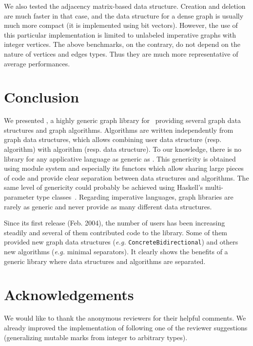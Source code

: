We also tested the adjacency matrix-based data structure. Creation and
deletion are much faster in that case, and the data structure for
a dense graph is usually much more compact (it is implemented using bit
vectors). However, the use of this particular implementation is
limited to unlabeled imperative graphs with integer vertices. 
The above benchmarks, on the contrary, do not depend on the nature of
vertices and edges types. Thus they are much more representative of
\ocamlgraph average performances.


\section{Conclusion}

We presented \ocamlgraph, a highly generic graph library for \ocaml\
providing several graph data structures and graph algorithms.
Algorithms are written independently from graph data structures, which
allows combining user data structure (resp. algorithm) with
\ocamlgraph algorithm (resp. data structure).  To our knowledge, there
is no library for any applicative language as generic as \ocamlgraph.
This genericity is obtained using \ocaml module system and especially
its functors which allow sharing large pieces of code and provide
clear separation between data structures and algorithms.  The same
level of genericity could probably be achieved using Haskell's
multi-parameter type
classes~\cite{XII:Dreyer2007,XII:Wehr2005,XII:Oleg}.  Regarding
imperative languages, graph libraries are rarely as generic and never
provide as many different data structures.

Since its first release (Feb. 2004), the number of \ocamlgraph users
has been increasing steadily and several of them contributed code to
the library. Some of them provided new graph data structures
(\emph{e.g.}  \texttt{ConcreteBidirectional}) and others new
algorithms (\emph{e.g.} minimal separators). It clearly shows the
benefits of a generic library where data structures and algorithms are
separated.


\section*{Acknowledgements}

We would like to thank the anonymous reviewers for their helpful
comments. We already improved the implementation of \ocamlgraph
following one of the reviewer suggestions (generalizing mutable marks
from integer to arbitrary types).

